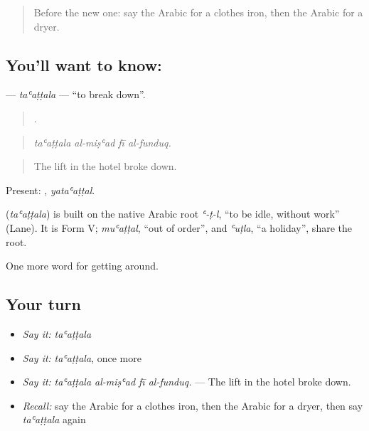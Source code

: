\label{lesson:AR-C447-taattala}



\begin{quote}
Before the new one: say the Arabic for a clothes iron, then the Arabic for a dryer.
\end{quote}

\subsection*{You'll want to know: }
\textbf{} — \emph{taʿaṭṭala} — \textquotedblleft{}to break down\textquotedblright{}.

\begin{quote}
   .
\end{quote}

\begin{quote}
\emph{taʿaṭṭala al-miṣʿad fī al-funduq.}
\end{quote}

\begin{quote}
The lift in the hotel broke down.
\end{quote}

Present: , \emph{yataʿaṭṭal}.

\begin{cousinweb}
\textbf{} (\emph{taʿaṭṭala}) is built on the native Arabic root \emph{ʿ-ṭ-l}, \textquotedblleft{}to be idle, without work\textquotedblright{} (Lane). It is Form V; \emph{muʿaṭṭal}, \textquotedblleft{}out of order\textquotedblright{}, and \emph{ʿuṭla}, \textquotedblleft{}a holiday\textquotedblright{}, share the root.
\end{cousinweb}

\begin{grammarlens}[title={What you've built}]
One more word for getting around.
\end{grammarlens}

\subsection*{Your turn}
\begin{itemize}
\raggedright
  \item \emph{Say it:} \emph{taʿaṭṭala}
  \item \emph{Say it:} \emph{taʿaṭṭala}, once more
  \item \emph{Say it:} \emph{taʿaṭṭala al-miṣʿad fī al-funduq.} — The lift in the hotel broke down.
  \item \emph{Recall:} say the Arabic for a clothes iron, then the Arabic for a dryer, then say \emph{taʿaṭṭala} again
\end{itemize}

